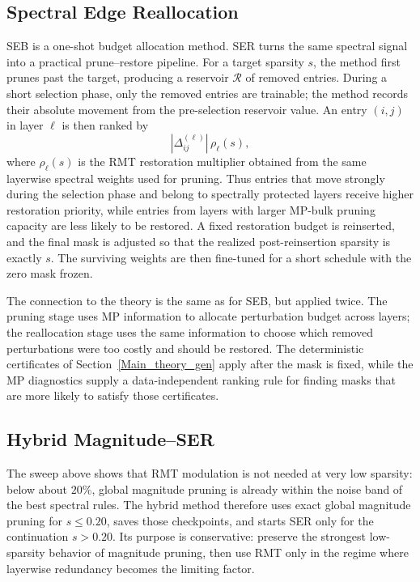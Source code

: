 \documentclass[11pt]{article}
\theoremstyle{plain}
\theoremstyle{definition}
\theoremstyle{remark}
\newcommand{\1}{\mathbf{1}}
\begin{document}
\subsection{Spectral Edge Reallocation}
\label{subsec:ser_method}

SEB is a one-shot budget allocation method.  SER turns the same spectral signal into a practical prune--restore pipeline.  For a target sparsity \(s\), the method first prunes past the target, producing a reservoir \(\mathcal{R}\) of removed entries.  During a short selection phase, only the removed entries are trainable; the method records their absolute movement from the pre-selection reservoir value.  An entry \((i,j)\) in layer \(\ell\) is then ranked by
\[
|\Delta_{ij}^{(\ell)}|\,\rho_\ell(s),
\]
where \(\rho_\ell(s)\) is the RMT restoration multiplier obtained from the same layerwise spectral weights used for pruning.  Thus entries that move strongly during the selection phase and belong to spectrally protected layers receive higher restoration priority, while entries from layers with larger MP-bulk pruning capacity are less likely to be restored.  A fixed restoration budget is reinserted, and the final mask is adjusted so that the realized post-reinsertion sparsity is exactly \(s\).  The surviving weights are then fine-tuned for a short schedule with the zero mask frozen.

The connection to the theory is the same as for SEB, but applied twice.  The pruning stage uses MP information to allocate perturbation budget across layers; the reallocation stage uses the same information to choose which removed perturbations were too costly and should be restored.  The deterministic certificates of Section~\ref{Main_theory_gen} apply after the mask is fixed, while the MP diagnostics supply a data-independent ranking rule for finding masks that are more likely to satisfy those certificates.

\subsection{Hybrid Magnitude--SER}
\label{subsec:hybrid_ser_method}

The sweep above shows that RMT modulation is not needed at very low sparsity: below about \(20\%\), global magnitude pruning is already within the noise band of the best spectral rules.  The hybrid method therefore uses exact global magnitude pruning for \(s\le0.20\), saves those checkpoints, and starts SER only for the continuation \(s>0.20\).  Its purpose is conservative: preserve the strongest low-sparsity behavior of magnitude pruning, then use RMT only in the regime where layerwise redundancy becomes the limiting factor.
\end{document}
